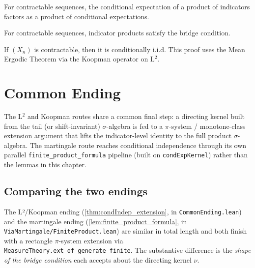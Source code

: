 \begin{theorem}
  \label{thm:condexp_product_factorization}
  \leanok
  For contractable sequences, the conditional expectation of a product
  of indicators factors as a product of conditional expectations.
\end{theorem}

\begin{lemma}
  \label{lem:indicator_product_bridge_contractable}
  \leanok
  For contractable sequences, indicator products satisfy the bridge condition.
\end{lemma}

\begin{theorem}
  \label{thm:conditionallyIID_of_contractable_Koopman}
  \leanok
  If $(X_n)$ is contractable, then it is conditionally i.i.d.
  This proof uses the Mean Ergodic Theorem via the Koopman operator on L$^2$.
\end{theorem}


\chapter{Common Ending}

The L$^2$ and Koopman routes share a common final step: a directing kernel built from
the tail (or shift-invariant) $\sigma$-algebra is fed to a $\pi$-system / monotone-class
extension argument that lifts the indicator-level identity to the full product
$\sigma$-algebra. The martingale route reaches conditional independence through its own
parallel \texttt{finite\_product\_formula} pipeline (built on
\texttt{condExpKernel}) rather than the lemmas in this chapter.

\section{Comparing the two endings}

The L²/Koopman ending (\ref{thm:condIndep_extension}, in
\texttt{CommonEnding.lean}) and the martingale ending
(\ref{lem:finite_product_formula}, in
\texttt{ViaMartingale/FiniteProduct.lean}) are similar in total length and both
finish with a rectangle $\pi$-system extension via
\texttt{MeasureTheory.ext\_of\_generate\_finite}. The substantive
difference is the \emph{shape of the bridge condition} each accepts
about the directing kernel $\nu$.

